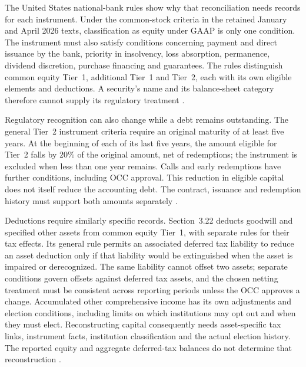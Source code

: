 The United States national-bank rules show why that reconciliation needs
records for each instrument. Under the common-stock criteria in the retained
January and April 2026 texts, classification as equity under GAAP is only one
condition. The instrument must also satisfy conditions concerning payment and
direct issuance by the bank, priority in insolvency, loss absorption, permanence,
dividend discretion, purchase financing and guarantees. The rules distinguish
common equity Tier~1, additional Tier~1 and Tier~2, each with its own eligible
elements and deductions. A security's name and its balance-sheet category
therefore cannot supply its regulatory treatment
\citep[12~CFR~3.20(a)--(d)]{occcapitaleligibility2026}.

Regulatory recognition can also change while a debt remains outstanding.
The general Tier~2 instrument criteria require an original maturity of at
least five years. At the beginning of each of its last five years, the amount
eligible for Tier~2 falls by 20\% of the original amount, net of redemptions;
the instrument is excluded when less than one year remains. Calls and early
redemptions have further conditions, including OCC approval. This reduction
in eligible capital does not itself reduce the accounting debt. The contract,
issuance and redemption history must support both amounts separately
\citep[12~CFR~3.20(d)(1), including footnote~7]{occcapitaleligibility2026}.

Deductions require similarly specific records. Section~3.22 deducts goodwill
and specified other assets from common equity Tier~1, with separate rules for
their tax effects. Its general rule permits an associated deferred tax
liability to reduce an asset deduction only if that liability would be
extinguished when the asset is impaired or derecognized. The same liability
cannot offset two assets; separate conditions govern offsets against deferred
tax assets, and the chosen netting treatment must be consistent across
reporting periods unless the OCC approves a change. Accumulated other
comprehensive income has its own adjustments and election conditions,
including limits on which institutions may opt out and when they must elect.
Reconstructing capital consequently needs asset-specific tax links, instrument
facts, institution classification and the actual election history. The reported
equity and aggregate deferred-tax balances do not determine that reconstruction
\citep[12~CFR~3.22(a), (b), (e)]{occcapitaldeductions2026}.

